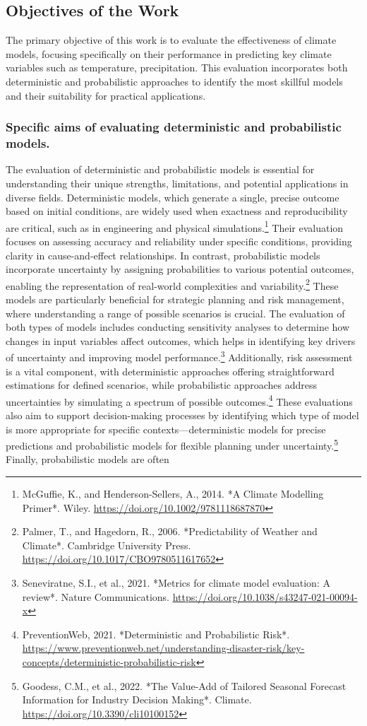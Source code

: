\subsection{Objectives of the Work}
The primary objective of this work is to evaluate the effectiveness of climate models, focusing specifically on their performance in predicting key climate variables such as temperature, precipitation. This evaluation incorporates both deterministic and probabilistic approaches to identify the most skillful models and their suitability for practical applications.

\subsubsection{Specific aims  of evaluating deterministic and probabilistic models.
}
The evaluation of deterministic and probabilistic models is essential for understanding their unique strengths, limitations, and potential applications in diverse fields. Deterministic models, which generate a single, precise outcome based on initial conditions, are widely used when exactness and reproducibility are critical, such as in engineering and physical simulations.\footnote{McGuffie, K., and Henderson-Sellers, A., 2014. *A Climate Modelling Primer*. Wiley. \url{https://doi.org/10.1002/9781118687870}} Their evaluation focuses on assessing accuracy and reliability under specific conditions, providing clarity in cause-and-effect relationships. In contrast, probabilistic models incorporate uncertainty by assigning probabilities to various potential outcomes, enabling the representation of real-world complexities and variability.\footnote{Palmer, T., and Hagedorn, R., 2006. *Predictability of Weather and Climate*. Cambridge University Press. \url{https://doi.org/10.1017/CBO9780511617652}} These models are particularly beneficial for strategic planning and risk management, where understanding a range of possible scenarios is crucial. The evaluation of both types of models includes conducting sensitivity analyses to determine how changes in input variables affect outcomes, which helps in identifying key drivers of uncertainty and improving model performance.\footnote{Seneviratne, S.I., et al., 2021. *Metrics for climate model evaluation: A review*. Nature Communications. \url{https://doi.org/10.1038/s43247-021-00094-x}} Additionally, risk assessment is a vital component, with deterministic approaches offering straightforward estimations for defined scenarios, while probabilistic approaches address uncertainties by simulating a spectrum of possible outcomes.\footnote{PreventionWeb, 2021. *Deterministic and Probabilistic Risk*. \url{https://www.preventionweb.net/understanding-disaster-risk/key-concepts/deterministic-probabilistic-risk}} These evaluations also aim to support decision-making processes by identifying which type of model is more appropriate for specific contexts—deterministic models for precise predictions and probabilistic models for flexible planning under uncertainty.\footnote{Goodess, C.M., et al., 2022. *The Value-Add of Tailored Seasonal Forecast Information for Industry Decision Making*. Climate. \url{https://doi.org/10.3390/cli10100152}} Finally, probabilistic models are often 